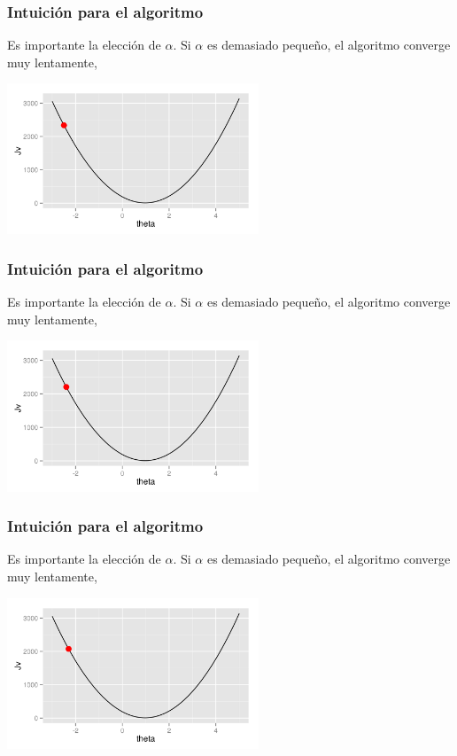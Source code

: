 \documentclass[aspectratio=169]{beamer}
\begin{document}
\begin{frame}
 \frametitle{Intuición para el algoritmo}
 \begin{overlayarea}{\textwidth}{8cm}
Es importante la elección de $\alpha$. Si $\alpha$ es demasiado pequeño, el algoritmo converge muy lentamente,
\begin{center}
  \includegraphics[height=4.5cm]{gradientdescent-smallalpha-6.png}
\end{center}
 \end{overlayarea}
\end{frame}

\begin{frame}
 \frametitle{Intuición para el algoritmo}
 \begin{overlayarea}{\textwidth}{8cm}
Es importante la elección de $\alpha$. Si $\alpha$ es demasiado pequeño, el algoritmo converge muy lentamente,
\begin{center}
  \includegraphics[height=4.5cm]{gradientdescent-smallalpha-7.png}
\end{center}
 \end{overlayarea}
\end{frame}

\begin{frame}
 \frametitle{Intuición para el algoritmo}
 \begin{overlayarea}{\textwidth}{8cm}
Es importante la elección de $\alpha$. Si $\alpha$ es demasiado pequeño, el algoritmo converge muy lentamente,
\begin{center}
  \includegraphics[height=4.5cm]{gradientdescent-smallalpha-8.png}
\end{center}
 \end{overlayarea}
\end{frame}
\end{document}
